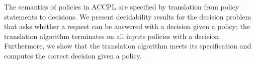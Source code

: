 The semantics of policies in \ac{ACCPL} are specified by translation from policy statements to decisions. We present decidability results for the decision problem that asks whether a request can be answered with a decision given a policy; the translation algorithm terminates on all inputs policies with a decision. Furthermore, we show that the translation algorithm meets its specification and computes the correct decision given a policy. 

\cleardoublepage

